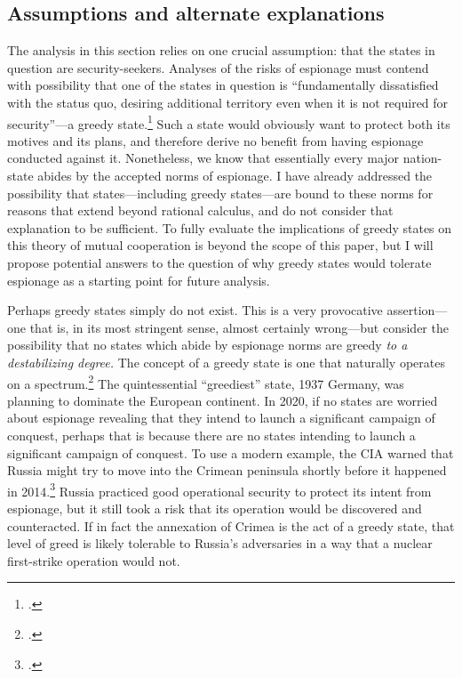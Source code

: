 \documentclass[12pt]{extarticle}
\begin{document}
\subsection{Assumptions and alternate explanations}
The analysis in this section relies on one crucial assumption: that the states in question are security-seekers. Analyses of the risks of espionage must contend with possibility that one of the states in question is \enquote{fundamentally dissatisfied with the status quo, desiring additional territory even when it is not required for security}---a greedy state.\footcite[4]{glaser_rational_2010} Such a state would obviously want to protect both its motives and its plans, and therefore derive no benefit from having espionage conducted against it. Nonetheless, we know that essentially every major nation-state abides by the accepted norms of espionage. I have already addressed the possibility that states---including greedy states---are bound to these norms for reasons that extend beyond rational calculus, and do not consider that explanation to be sufficient. To fully evaluate the implications of greedy states on this theory of mutual cooperation is beyond the scope of this paper, but I will propose potential answers to the question of why greedy states would tolerate espionage as a starting point for future analysis.

Perhaps greedy states simply do not exist. This is a very provocative assertion---one that is, in its most stringent sense, almost certainly wrong---but consider the possibility that no states which abide by espionage norms are greedy \emph{to a destabilizing degree.} The concept of a greedy state is one that naturally operates on a spectrum.\footcite[39. Throughout his book, Glaser simplifies and complicates his theory as is necessary for the particular analysis he is performing. Greedy states can be understood as the opposite of security-seeking states, or it can be its own independant variable, allowing for the possibility of states that are greedy \emph{and} security-seeking, or just one of the two.]{glaser_rational_2010} The quintessential \enquote{greediest} state, 1937 Germany, was planning to dominate the European continent. In 2020, if no states are worried about espionage revealing that they intend to launch a significant campaign of conquest, perhaps that is because there are no states intending to launch a significant campaign of conquest. To use a modern example, the CIA warned that Russia might try to move into the Crimean peninsula shortly before it happened in 2014.\footcite{hosenball_ukraine_2014} Russia practiced good operational security to protect its intent from espionage, but it still took a risk that its operation would be discovered and counteracted. If in fact the annexation of Crimea is the act of a greedy state, that level of greed is likely tolerable to Russia's adversaries in a way that a nuclear first-strike operation would not.
\end{document}
